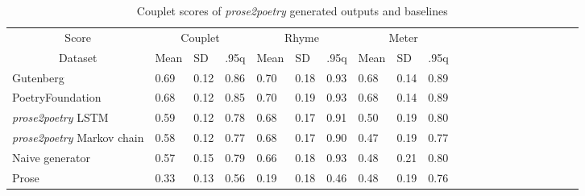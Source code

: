 \documentclass[11pt,a4paper]{article}
\begin{document}
\begin{table*}[ht]
\begin{tabular}{|l|l|l|l|l|l|l|l|l|l|l|c|c|c|c|c|c|c|c|c|c|}
\hline\hline
\multicolumn{1}{|c|}{Score} & \multicolumn{3}{c|}{Couplet} & \multicolumn{3}{c|}{Rhyme} & \multicolumn{3}{c|}{Meter}\\
\cline{1-10}
\multicolumn{1}{|c|}{Dataset} & Mean & SD & .95q & Mean & SD & .95q & Mean & SD & .95q \\
\hline\hline
Gutenberg & 0.69 & 0.12 & 0.86 & 0.70 & 0.18 & 0.93 & 0.68 & 0.14 & 0.89 \\ [0.5ex]
\hline
PoetryFoundation & 0.68 & 0.12 & 0.85 & 0.70 & 0.19 & 0.93 & 0.68 & 0.14 & 0.89 \\ [0.5ex]
\hline
\textit{prose2poetry} LSTM & 0.59 & 0.12 & 0.78 & 0.68 & 0.17 & 0.91 & 0.50 & 0.19 & 0.80 \\ [0.5ex]
\hline
\textit{prose2poetry} Markov chain & 0.58 & 0.12 & 0.77 & 0.68 & 0.17 & 0.90 & 0.47 & 0.19 & 0.77 \\ [0.5ex]
\hline
Naive generator & 0.57 & 0.15 & 0.79 & 0.66 & 0.18 & 0.93 & 0.48 & 0.21 & 0.80 \\ [0.5ex]
\hline
Prose & 0.33 & 0.13 & 0.56 & 0.19 & 0.18 & 0.46 & 0.48 & 0.19 & 0.76 \\ [0.5ex]
\hline
\end{tabular}

\caption{Couplet scores of \textit{prose2poetry} generated outputs and baselines}
\label{table:couplet_results}
\end{table*}
\end{document}
